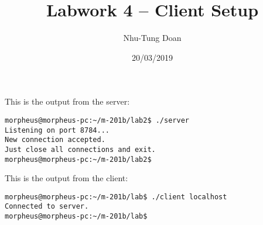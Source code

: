 \documentclass[12pt]{article}
\title{Labwork 4 -- Client Setup}
\author{Nhu-Tung Doan}
\date{20/03/2019}
\begin{document}
\maketitle

This is the output from the server:

\begin{verbatim}
morpheus@morpheus-pc:~/m-201b/lab2$ ./server
Listening on port 8784...
New connection accepted.
Just close all connections and exit.
morpheus@morpheus-pc:~/m-201b/lab2$
\end{verbatim}

This is the output from the client:

\begin{verbatim}
morpheus@morpheus-pc:~/m-201b/lab$ ./client localhost
Connected to server.
morpheus@morpheus-pc:~/m-201b/lab$
\end{verbatim}
\end{document}
